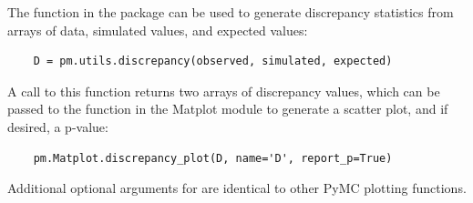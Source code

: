 The  function in the  package can be used to generate discrepancy statistics from arrays of data, simulated values, and expected values:

\begin{verbatim}
	D = pm.utils.discrepancy(observed, simulated, expected)
\end{verbatim}

A call to this function returns two arrays of discrepancy values, which can be passed to the  function in the Matplot module to generate a scatter plot, and if desired, a p-value:

\begin{verbatim}
	pm.Matplot.discrepancy_plot(D, name='D', report_p=True)
\end{verbatim}

Additional optional arguments for  are identical to other PyMC plotting functions.


